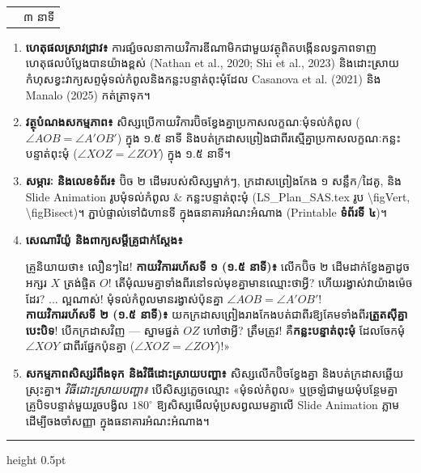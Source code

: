 \documentclass[a4paper,12pt]{article}
\makeatletter
\newcommand{\en}[1]{{\TimesEn #1}}
\newcommand{\enbf}[1]{{\TimesEn\textbf{#1}}}
\newcommand{\cnum}[1]{{\fontsize{10.5pt}{12pt}\selectfont\ding{\numexpr181+#1\relax}}}
\newcommand{\ang}[1]{\ensuremath{\angle #1}}
\newenvironment{phasebox}[3]{%
  \needspace{2.2cm}%
  \begin{tcolorbox}[
    enhanced, sharp corners, colback=headgray, colframe=black,
    boxrule=1.0pt, top=4pt, bottom=4pt, left=9pt, right=9pt,
    before skip=7pt, after skip=3pt
  ]%
    \renewcommand{\arraystretch}{1.0}%
    \begin{tabular*}{\linewidth}{@{}>{\raggedright\arraybackslash}p{13.60cm}@{\extracolsep{\fill}}r@{}}
      {\muol\fontsize{11pt}{17.5pt}\selectfont #1} & {\fontsize{10.5pt}{15pt}\selectfont\en{#2 |} #3}%
    \end{tabular*}%
  \end{tcolorbox}%
  \begingroup\fontsize{11.5pt}{18.2pt}\selectfont
}{%
  \par\endgroup\vspace{3pt}\hrule height 0.5pt\vspace{5pt}%
}
\makeatother
\begin{document}
\begin{phasebox}{ជំហានទី ២ \enbf{(}ខ\enbf{)}៖ រំឭកមេរៀនទាក់ទង \enbf{(}កាយវិការរហ័ស ១ \enbf{\&} ២\enbf{)}}{05--08 min}{៣ នាទី}
  \begin{enumerate}[leftmargin=0.45cm, topsep=2pt, itemsep=4pt, parsep=0pt]
    \item \textbf{ហេតុផលស្រាវជ្រាវ៖} ការផ្សំចលនាកាយវិការឌីណាមិកជាមួយវត្ថុពិតបង្កើនលទ្ធភាពទាញហេតុផលបំប្លែងបានយ៉ាងខ្ពស់ \en{(Nathan et al., 2020; Shi et al., 2023)} និងដោះស្រាយកំហុសខ្វះវាក្យសព្ទមុំទល់កំពូលនិងកន្លះបន្ទាត់ពុះមុំដែល \en{Casanova et al. (2021)} និង \en{Manalo (2025)} កត់ត្រាទុក។
    \item \textbf{វត្ថុបំណងសកម្មភាព៖} សិស្សប្រើកាយវិការប៊ិចខ្វែងគ្នាប្រកាសលក្ខណៈមុំទល់កំពូល ($\ang{AOB} = \ang{A'OB'}$) ក្នុង ១.៥ នាទី និងបត់ក្រដាសព្រៀងជាពីរស្មើគ្នាប្រកាសលក្ខណៈកន្លះបន្ទាត់ពុះមុំ ($\ang{XOZ} = \ang{ZOY}$) ក្នុង ១.៥ នាទី។
    \item \textbf{សម្ភារៈ និងលេខទំព័រ៖} ប៊ិច ២ ដើមរបស់សិស្សម្នាក់ៗ, ក្រដាសព្រៀងកែង ១ សន្លឹក/ដៃគូ, និង \en{Slide Animation} រូបមុំទល់កំពូល \& កន្លះបន្ទាត់ពុះមុំ (\en{LS\_Plan\_SAS.tex} រូប \en{\textbackslash figVert, \textbackslash figBisect})។ ភ្ជាប់ផ្ទាល់ទៅជំហានទី \cnum{2} ក្នុងធនាគារអំណះអំណាង (\en{Printable} \textbf{ទំព័រទី ៤})។
    \item \textbf{សេណារីយ៉ូ និងពាក្យសម្ដីគ្រូជាក់ស្ដែង៖}
      \begin{scriptbox}
        {\muol\fontsize{10.8pt}{17pt}\selectfont \enbf{«}គ្រូនិយាយថា៖} លឿនៗដៃ! \textbf{កាយវិការរហ័សទី ១ (១.៥ នាទី)៖} លើកប៊ិច ២ ដើមដាក់ខ្វែងគ្នាដូចអក្សរ $X$ ត្រង់ផ្ចិត $O$! តើមុំឈមគ្នាទាំងពីរនៅទល់មុខគ្នាមានឈ្មោះថាអ្វី? ហើយរង្វាស់វាយ៉ាងម៉េចដែរ? ... ល្អណាស់! មុំទល់កំពូលមានរង្វាស់ប៉ុនគ្នា $\ang{AOB} = \ang{A'OB'}$!\\
        \textbf{កាយវិការរហ័សទី ២ (១.៥ នាទី)៖} យកក្រដាសព្រៀងរាងកែងបត់ជាពីរឱ្យគែមទាំងពីរ\textbf{ត្រួតស៊ីគ្នាបេះបិទ}! បើកក្រដាសវិញ — ស្នាមផ្នត់ $OZ$ ហៅថាអ្វី? ត្រឹមត្រូវ! គឺ\textbf{កន្លះបន្ទាត់ពុះមុំ} ដែលចែកមុំ $\ang{XOY}$ ជាពីរផ្នែកប៉ុនគ្នា ($\ang{XOZ} = \ang{ZOY}$)!»
      \end{scriptbox}
    \item \textbf{សកម្មភាពសិស្សរំពឹងទុក និងវិធីដោះស្រាយបញ្ហា៖} សិស្សលើកប៊ិចខ្វែងគ្នា និងបត់ក្រដាសឆ្លើយស្រុះគ្នា។ \textit{វិធីដោះស្រាយបញ្ហា៖} បើសិស្សភ្លេចឈ្មោះ «មុំទល់កំពូល» ឬច្រឡំជាមួយមុំបន្ថែមគ្នា គ្រូបិទបន្ទាត់មួយរួចបង្វិល $180^\circ$ ឱ្យសិស្សមើលមុំប្រសព្វឈមគ្នាលើ \en{Slide Animation} ភ្លាម ដើម្បីចងចាំសញ្ញា \cnum{2} ក្នុងធនាគារអំណះអំណាង។
  \end{enumerate}
\end{phasebox}
\end{document}
